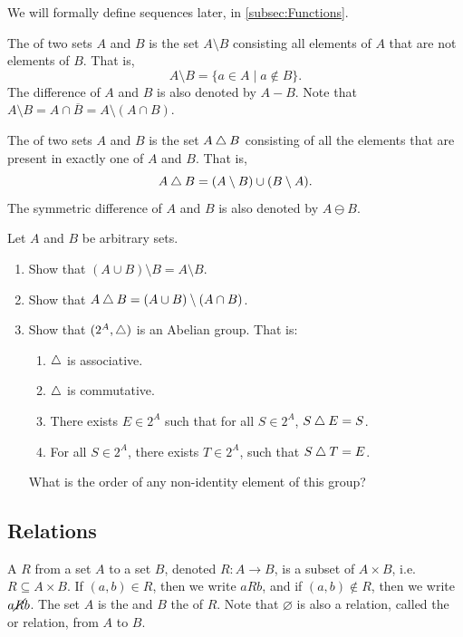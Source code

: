 \begin{Note*}
We will formally define sequences later, in \cref{subsec:Functions}.
\end{Note*}

The  of two sets $A$ and $B$ is the set $A \setminus B$ consisting all elements of $A$ that are not elements of $B$. That is,
\begin{equation*}
A \setminus B = \{ a \in A \mid a \notin B \}.
\end{equation*}
The difference of $A$ and $B$ is also denoted by $A - B$. Note that $A \setminus B = A \cap \overline B = A \setminus (A \cap B)$.

The  of two sets $A$ and $B$ is the set $A \mathbin{\triangle} B$ consisting of all the elements that are present in exactly one of $A$ and $B$. That is,
\begin{equation*}
A \mathbin{\triangle} B = (A \setminus B) \cup (B \setminus A).
\end{equation*}
The symmetric difference of $A$ and $B$ is also denoted by $A \ominus B$.

\begin{Exercise}
Let $A$ and $B$ be arbitrary sets.
\begin{enumerate}
\item Show that $(A \cup B) \setminus B = A \setminus B$.
\item Show that $A \mathbin{\triangle} B = (A \cup B) \setminus (A \cap B)$.
\item Show that $(2^A, \mathbin{\triangle})$ is an Abelian group. That is:
    \begin{enumerate}[label=(\roman*)]
    \item $\mathbin{\triangle}$ is associative.
    \item $\mathbin{\triangle}$ is commutative.
    \item There exists $E \in 2^A$ such that for all $S \in 2^A$, $S \mathbin{\triangle} E = S$.
    \item For all $S \in 2^A$, there exists $T \in 2^A$, such that $S \mathbin{\triangle} T = E$.
    \end{enumerate}
    What is the order of any non-identity element of this group?
\end{enumerate}
\end{Exercise}

\subsection{Relations}\label{subsec:Relations}
A  $R$ from a set $A$ to a set $B$, denoted $R \colon A \to B$, is a subset of $A \times B$, i.e. $R \subseteq A \times B$. If $(a, b) \in R$, then we write $aRb$, and if $(a, b) \notin R$, then we write $a \cancel{R} b$. The set $A$ is the  and $B$ the  of $R$. Note that $\varnothing$ is also a relation, called the  or  relation, from $A$ to $B$.

